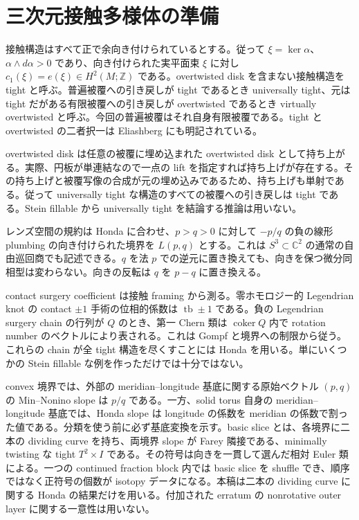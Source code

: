 \documentclass[12pt]{amsart}
\theoremstyle{definition}
\theoremstyle{remark}
\numberwithin{equation}{section}
\newcommand{\Z}{\mathbb{Z}}
\newcommand{\C}{\mathbb{C}}
\theoremstyle{definition}
\begin{document}
\section{三次元接触多様体の準備}\label{ja-prelim}
接触構造はすべて正で余向き付けられているとする。従って $\xi=\ker\alpha$、$\alpha\wedge d\alpha>0$ であり、向き付けられた実平面束 $\xi$ に対し $c_1(\xi)=e(\xi)\in H^2(M;\Z)$ である。overtwisted disk を含まない接触構造を tight と呼ぶ。普遍被覆への引き戻しが tight であるとき universally tight、元は tight だがある有限被覆への引き戻しが overtwisted であるとき virtually overtwisted と呼ぶ。今回の普遍被覆はそれ自身有限被覆である。tight と overtwisted の二者択一は Eliashberg \cite[Theorem 1.4.1]{ja-Eliashberg} にも明記されている。

overtwisted disk は任意の被覆に埋め込まれた overtwisted disk として持ち上がる。実際、円板が単連結なので一点の lift を指定すれば持ち上げが存在する。その持ち上げと被覆写像の合成が元の埋め込みであるため、持ち上げも単射である。従って universally tight な構造のすべての被覆への引き戻しは tight である。Stein fillable から universally tight を結論する推論は用いない。

レンズ空間の規約は Honda に合わせ、$p>q>0$ に対して $-p/q$ の負の線形 plumbing の向き付けられた境界を $L(p,q)$ とする。これは $S^3\subset\C^2$ の通常の自由巡回商でも記述できる。$q$ を法 $p$ での逆元に置き換えても、向きを保つ微分同相型は変わらない。向きの反転は $q$ を $p-q$ に置き換える。

contact surgery coefficient は接触 framing から測る。零ホモロジー的 Legendrian knot の contact $\pm1$ 手術の位相的係数は $\operatorname{tb}\pm1$ である。負の Legendrian surgery chain の行列が $Q$ のとき、第一 Chern 類は $\operatorname{coker}Q$ 内で rotation number のベクトルにより表される。これは Gompf \cite[Proposition 2.3]{ja-Gompf} と境界への制限から従う。これらの chain が全 tight 構造を尽くすことには Honda \cite[Theorem 2.1, Section 4.6.2]{ja-Honda} を用いる。単にいくつかの Stein fillable な例を作っただけでは十分ではない。

convex 境界では、外部の meridian--longitude 基底に関する原始ベクトル $(p,q)$ の Min--Nonino slope は $p/q$ である。一方、solid torus 自身の meridian--longitude 基底では、Honda slope は longitude の係数を meridian の係数で割った値である。分類を使う前に必ず基底変換を示す。basic slice とは、各境界に二本の dividing curve を持ち、両境界 slope が Farey 隣接である、minimally twisting な tight $T^2\times I$ である。その符号は向きを一貫して選んだ相対 Euler 類による。一つの continued fraction block 内では basic slice を shuffle でき、順序ではなく正符号の個数が isotopy データになる。本稿は二本の dividing curve に関する Honda の結果だけを用いる。付加された erratum の nonrotative outer layer に関する一意性は用いない。
\end{document}
